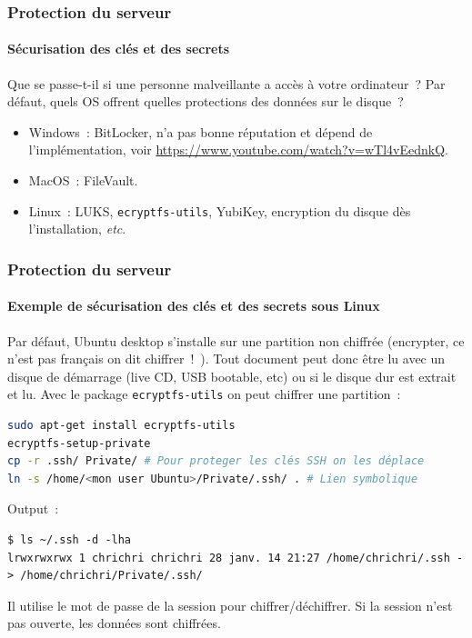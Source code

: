 \documentclass{beamer}
\begin{document}
    \begin{frame}
        \frametitle{Protection du serveur}
        \framesubtitle{Sécurisation des clés et des secrets}
        \transdissolve
        Que se passe-t-il si une personne malveillante a accès à votre ordinateur~?
        \bigbreak
        Par défaut, quels OS offrent quelles protections des données sur le disque~?
        \pause
        \bigbreak
        \begin{itemize}
            \item Windows~: BitLocker, n'a pas bonne réputation et dépend de l'implémentation, voir \url{https://www.youtube.com/watch?v=wTl4vEednkQ}.
            \item MacOS~: FileVault.
            \item Linux~: LUKS, \lstinline{ecryptfs-utils}, YubiKey, encryption du disque dès l'installation, \textit{etc}.
        \end{itemize}
    \end{frame}

    \begin{frame}[fragile]
        \frametitle{Protection du serveur}
        \framesubtitle{Exemple de sécurisation des clés et des secrets sous Linux}
        \transdissolve
        Par défaut, Ubuntu desktop s’installe sur une partition non
        chiffrée (encrypter, ce n’est pas français on dit chiffrer~!~).
        Tout document peut donc être lu avec un disque de
        démarrage (live CD, USB bootable, etc) ou si le disque dur
        est extrait et lu.
        \bigbreak
        Avec le package \lstinline{ecryptfs-utils} on peut chiffrer une partition~:
        \begin{lstlisting}[language=bash]
sudo apt-get install ecryptfs-utils
ecryptfs-setup-private
cp -r .ssh/ Private/ # Pour proteger les clés SSH on les déplace
ln -s /home/<mon user Ubuntu>/Private/.ssh/ . # Lien symbolique
        \end{lstlisting}
        Output~:
        \begin{lstlisting}
$ ls ~/.ssh -d -lha
lrwxrwxrwx 1 chrichri chrichri 28 janv. 14 21:27 /home/chrichri/.ssh -> /home/chrichri/Private/.ssh/
        \end{lstlisting}
        Il utilise le mot de passe de la session pour chiffrer/déchiffrer.
        Si la session n'est pas ouverte, les données sont chiffrées.
    \end{frame}
\end{document}
